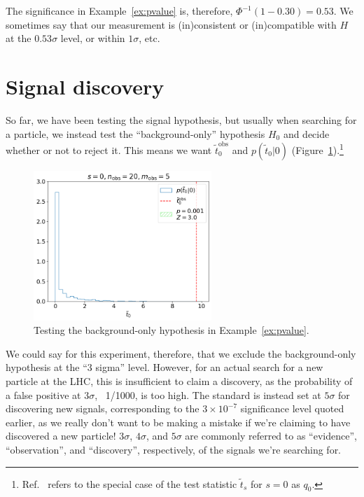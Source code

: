 The significance in Example~\ref{ex:pvalue} is, therefore, $\Phi^{-1}(1-0.30) = 0.53$.
We sometimes say that our measurement is (in)consistent or (in)compatible with $H$ at the $0.53\sigma$ level, or within $1\sigma$, etc.

\section{Signal discovery}

So far, we have been testing the signal hypothesis, but usually when searching for a particle, we instead test the ``background-only'' hypothesis $H_0$ and decide whether or not to reject it.
This means we want $\tilde{t}^{\mathrm{obs}}_0$ and $p(\tilde{t}_0|0)$ (Figure~\ref{fig:H0}).\footnote{Ref.~\cite{Cowan:2010js} refers to the special case of the test statistic $\tilde{t}_s$ for $s = 0$ as $q_0$.}

\begin{figure}[htb]
\centering
\includegraphics[width=0.6\textwidth]{figures/02-hypothesis-testing/4.png}
\captionsetup{justification=centering}
\caption{Testing the background-only hypothesis in Example~\ref{ex:pvalue}.}
\label{fig:H0}
\end{figure}

We could say for this experiment, therefore, that we exclude the background-only hypothesis at the ``3 sigma'' level.
However, for an actual search for a new particle at the LHC, this is insufficient to claim a discovery, as the probability of a false positive at $3\sigma$, ~1/1000, is too high.
The standard is instead set at $5\sigma$ for discovering new signals, corresponding to the $3\times10^{-7}$ significance level quoted earlier, as we really don't want to be making a mistake if we're claiming to have discovered a new particle!
$3\sigma$, $4\sigma$, and $5\sigma$ are commonly referred to as ``evidence'', ``observation'', and ``discovery'', respectively, of the signals we're searching for.

